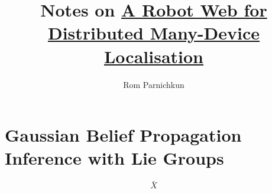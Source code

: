 \documentclass[twocolumn]{article}
\begin{document}
\title{Notes on \href{https://arxiv.org/pdf/2202.03314.pdf}{A Robot Web for Distributed Many-Device Localisation}}
\author{Rom Parnichkun}

\maketitle

\section{Gaussian Belief Propagation Inference with Lie Groups}

\begin{equation}
    \bar{X}
\end{equation}
\end{document}
